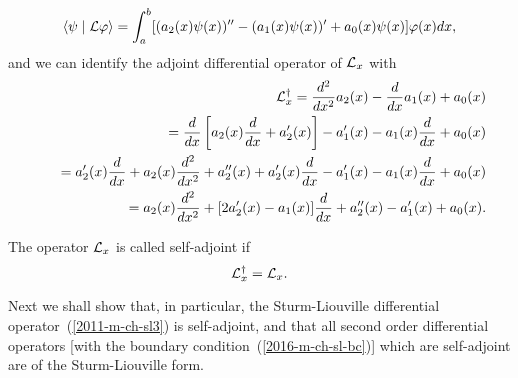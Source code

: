 \begin{equation}
\langle \psi \mid {\cal L} \varphi \rangle
=
  \int_a^b
[( a_2(x)\psi (x) )'' - ( a_1(x)\psi (x)  )'    + a_0(x) \psi (x)] \varphi(x)
dx
,
\label{2011-m-ch-slspbtfao1aaa1}
\end{equation}
and we can identify the adjoint differential operator of ${\cal L}_x$ with
\begin{equation}
\begin{split}
{\cal L}_x^\dagger
=\frac{d^2}{dx^2}  a_2(x)  - \frac{d }{dx } a_1(x)    + a_0(x) \\
\qquad =
\frac{d}{dx} \left[ a_2(x) \frac{d}{dx} + a'_2(x)\right]  - a'_1(x) - a_1(x)\frac{d }{dx }    + a_0(x) \\
\qquad =
 a'_2(x) \frac{d}{dx} + a_2(x) \frac{d^2}{dx^2} + a''_2(x) + a'_2(x)\frac{d}{dx}
  - a'_1(x) - a_1(x)\frac{d }{dx }    + a_0(x)  \\
\qquad =
 a_2(x) \frac{d^2}{dx^2}
+
[2 a'_2(x)- a_1(x) ]  \frac{d}{dx}
+ a''_2(x)   - a'_1(x)   + a_0(x)
.
\end{split}
\label{2011-m-ch-slspbtfaob}
\end{equation}

The operator ${\cal L}_x$ is called self-adjoint if
\begin{equation}
{\cal L}_x^\dagger
=  {\cal L}_x .
\label{2011-m-ch-slspbtfaob1}
\end{equation}

Next we shall show that, in particular, the Sturm-Liouville differential operator~(\ref{2011-m-ch-sl3}) is self-adjoint,
and that all second order differential operators [with the boundary condition~(\ref{2016-m-ch-sl-bc})] which are  self-adjoint
are of the Sturm-Liouville form.

